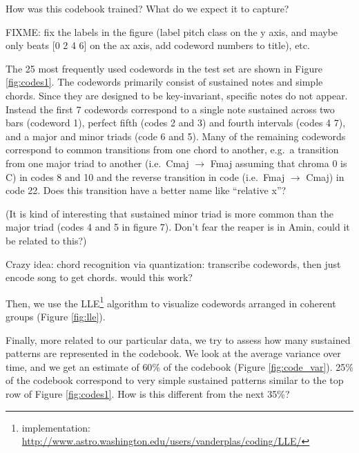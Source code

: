 \documentclass{article}
\newcommand{\ie}{i.e.~}
\newcommand{\eg}{e.g.~}
\begin{document}
How was this codebook trained?
What do we expect it to capture?

FIXME: fix the labels in the figure (label pitch class on the y axis,
and maybe only beats [0 2 4 6] on the ax axis, add codeword numbers to
title), etc.

The 25 most frequently used codewords in the test set are shown in
Figure \ref{fig:codes1}.  The codewords primarily consist of sustained
notes and simple chords.  Since they are designed to be key-invariant,
specific notes do not appear.  Instead the first 7 codewords
correspond to a single note sustained across two bars (codeword 1),
perfect fifth (codes 2 and 3) and fourth intervals (codes 4 7), and a
major and minor triads (code 6 and 5).  Many of the remaining
codewords correspond to common transitions from one chord to another,
\eg a transition from one major triad to another (\ie Cmaj
$\rightarrow$ Fmaj assuming that chroma 0 is C) in codes 8 and 10 and
the reverse transition in code (\ie Fmaj $\rightarrow$ Cmaj) in code
22.  Does this transition have a better name like ``relative x''?

(It is kind of interesting that sustained minor triad is more common
than the major triad (codes 4 and 5 in figure 7).  Don't fear the
reaper is in Amin, could it be related to this?)



Crazy idea: chord recognition via quantization: transcribe codewords,
then just encode song to get chords. would this work?


Then, we use the LLE\footnote{implementation:
  \url{http://www.astro.washington.edu/users/vanderplas/coding/LLE/}}
algorithm \cite{Roweis2000} to visualize codewords arranged in
coherent groups (Figure \ref{fig:lle}).

Finally, more related to our particular data, we try to assess how many
sustained patterns are represented in the codebook. We look at
the average variance over time, and we get an estimate of $60\%$ of the
codebook (Figure \ref{fig:code_var}).  25\% of the codebook correspond
to very simple sustained patterns similar to the top row of Figure
\ref{fig:codes1}.  How is this different from the next 35\%?
\end{document}

